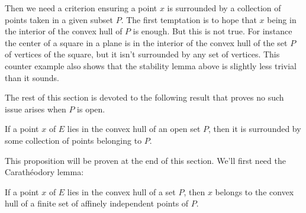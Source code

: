 Then we need a criterion ensuring a point $x$ is surrounded by a collection of points taken
in a given subset $P$. The first temptation is to hope that $x$ being in the interior of
the convex hull of $P$ is enough. But this is not true. For instance the center of a square
in a plane is in the interior of the convex hull of the set $P$ of vertices of the square,
but it isn't surrounded by any set of vertices. This counter example also shows that
the stability lemma above is slightly less trivial than it sounds.

The rest of this section is devoted to the following result that proves no such issue arises
when $P$ is open.

\begin{proposition}
  \label{prop:surrounded_by_open}
  \leanok
  If a point $x$ of $E$ lies in the convex hull of an open set $P$,
  then it is surrounded by some collection of points belonging to $P$.
\end{proposition}

This proposition will be proven at the end of this section.
We'll first need the Carathéodory lemma:

\begin{lemma}
\label{lem:caratheodory}
\leanok
  If a point $x$ of $E$ lies in the convex hull of a set $P$, then $x$
  belongs to the convex hull of a finite set of affinely independent points
  of $P$.
\end{lemma}

